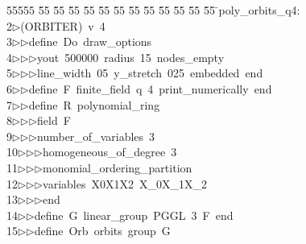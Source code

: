 %
%
\begin{tabbing}
55555 \= 55 \= 55 \= 55 \= 55 \= 55 \= 55 \= 55 \= 55 \= 55 \= 55 \= 55 \= 55 \= \>poly\_orbits\_q4:\\[0pt]
2\>$\triangleright$\>(ORBITER)\ v\ 4\ \\[0pt]
3\>$\triangleright$\>$\triangleright$\>define\ Do\ draw\_options\ \\[0pt]
4\>$\triangleright$\>$\triangleright$\>$\triangleright$\>yout\ 500000\ radius\ 15\ nodes\_empty\ \\[0pt]
5\>$\triangleright$\>$\triangleright$\>$\triangleright$\>line\_width\ 05\ y\_stretch\ 025\ embedded\ end\ \\[0pt]
6\>$\triangleright$\>$\triangleright$\>define\ F\ finite\_field\ q\ 4\ print\_numerically\ end\ \\[0pt]
7\>$\triangleright$\>$\triangleright$\>define\ R\ polynomial\_ring\ \\[0pt]
8\>$\triangleright$\>$\triangleright$\>$\triangleright$\>field\ F\ \\[0pt]
9\>$\triangleright$\>$\triangleright$\>$\triangleright$\>number\_of\_variables\ 3\ \\[0pt]
10\>$\triangleright$\>$\triangleright$\>$\triangleright$\>homogeneous\_of\_degree\ 3\ \\[0pt]
11\>$\triangleright$\>$\triangleright$\>$\triangleright$\>monomial\_ordering\_partition\ \\[0pt]
12\>$\triangleright$\>$\triangleright$\>$\triangleright$\>variables\ X0X1X2\ X\_0X\_1X\_2\ \\[0pt]
13\>$\triangleright$\>$\triangleright$\>$\triangleright$\>end\ \\[0pt]
14\>$\triangleright$\>$\triangleright$\>define\ G\ linear\_group\ PGGL\ 3\ F\ end\ \\[0pt]
15\>$\triangleright$\>$\triangleright$\>define\ Orb\ orbits\ group\ G\ \\[0pt]

\end{tabbing}
